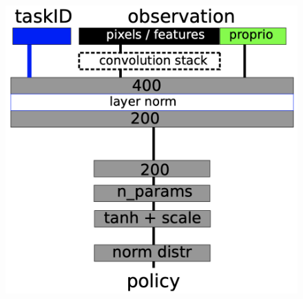 \documentclass{beamer}
\begin{document}
\begin{frame}
\begin{columns}
		\begin{figure}[H]
			\includegraphics[scale=0.3]{monolithic-arch.png}
		\end{figure}
	\end{columns}
\end{frame}
\end{document}
